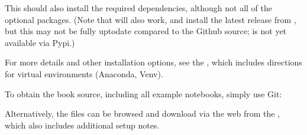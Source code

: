 \documentclass[letterpaper,table,10pt,english]{jupyterBook}
\begin{document}
\begin{sphinxVerbatim}[commandchars=\\\{\}]
  
  

\end{sphinxVerbatim}

\sphinxAtStartPar
This should also install the required dependencies, although not all of the optional packages. (Note that  will also work, and install the latest release from , but this may not be fully up\sphinxhyphen{}to\sphinxhyphen{}date compared to the Github source;  is not yet available via Pypi.)

\sphinxAtStartPar
For more details and other installation options, see the , which includes directions for virtual environments (Anaconda, Venv).

\sphinxAtStartPar
To obtain the book source, including all example notebooks, simply use Git:

\begin{sphinxVerbatim}[commandchars=\\\{\}]
  
\end{sphinxVerbatim}

\sphinxAtStartPar
Alternatively, the files can be browsed and download via the web from the , which also includes additional setup notes.
\end{document}
